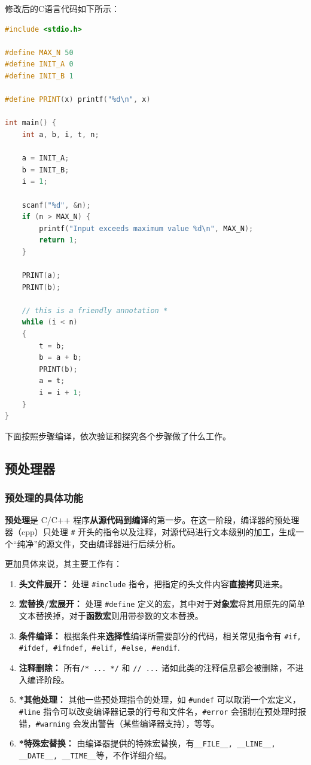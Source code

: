 \documentclass[UTF8,a4paper,10pt]{ctexart}
\begin{document}
\label{code1}

修改后的C语言代码如下所示：
\begin{lstlisting}[title=一个简单的斐波那契数列C程序,frame=trbl,language={C++}]
#include <stdio.h>

#define MAX_N 50
#define INIT_A 0
#define INIT_B 1

#define PRINT(x) printf("%d\n", x)

int main() {
    int a, b, i, t, n;

    a = INIT_A;
    b = INIT_B;
    i = 1;

    scanf("%d", &n);
    if (n > MAX_N) {
        printf("Input exceeds maximum value %d\n", MAX_N);
        return 1;
    }

    PRINT(a);
    PRINT(b);

    // this is a friendly annotation *
    while (i < n)
    {
        t = b;
        b = a + b;
        PRINT(b);
        a = t;
        i = i + 1;
    }
}
\end{lstlisting}

下面按照步骤编译，依次验证和探究各个步骤做了什么工作。

\vspace{1em}

\subsection{预处理器}
\subsubsection{预处理的具体功能}
\textbf{预处理}是 C/C++ 程序\textbf{从源代码到编译}的第一步。在这一阶段，编译器的预处理器（cpp）只处理 \texttt{\#} 开头的指令以及注释，对源代码进行文本级别的加工，生成一个“纯净”的源文件，交由编译器进行后续分析。

更加具体来说，其主要工作有：
\begin{enumerate}
    \item \textbf{头文件展开：} 处理 \texttt{\#include} 指令，把指定的头文件内容\textbf{直接拷贝}进来。
    \item \textbf{宏替换/宏展开：} 处理 \texttt{\#define} 定义的宏，其中对于\textbf{对象宏}将其用原先的简单文本替换掉，对于\textbf{函数宏}则用带参数的文本替换。
    \item \textbf{条件编译：} 根据条件来\textbf{选择性}编译所需要部分的代码，相关常见指令有 \texttt{\#if, \#ifdef, \#ifndef, \#elif, \#else, \#endif}.
    \item \textbf{注释删除：} 所有\texttt{/* ... */} 和 \texttt{// ...} 诸如此类的注释信息都会被删除，不进入编译阶段。
    \item \textbf{*其他处理：} 其他一些预处理指令的处理，如 \texttt{\#undef} 可以取消一个宏定义，\texttt{\#line} 指令可以改变编译器记录的行号和文件名，\texttt{\#error} 会强制在预处理时报错，\texttt{\#warning} 会发出警告（某些编译器支持），等等。
    \item \textbf{*特殊宏替换：} 由编译器提供的特殊宏替换，有\texttt{\_\_FILE\_\_, \_\_LINE\_\_, \_\_DATE\_\_, \_\_TIME\_\_}等，不作详细介绍。
\end{enumerate}
\end{document}
